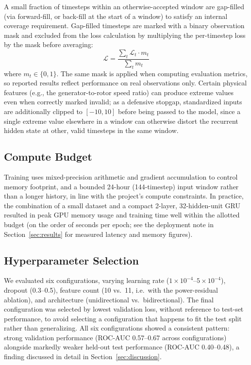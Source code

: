 \documentclass[conference]{IEEEtran}
\begin{document}
A small fraction of timesteps within an otherwise-accepted window are
gap-filled (via forward-fill, or back-fill at the start of a window) to
satisfy an internal coverage requirement. Gap-filled timesteps are marked
with a binary observation mask and excluded from the loss calculation by
multiplying the per-timestep loss by the mask before averaging:
\begin{equation}
\mathcal{L} = \frac{\sum_t \mathcal{L}_t \cdot m_t}{\sum_t m_t}
\end{equation}
where $m_t \in \{0, 1\}$. The same mask is applied when computing
evaluation metrics, so reported results reflect performance on real
observations only. Certain physical features (e.g., the generator-to-rotor
speed ratio) can produce extreme values even when correctly marked
invalid; as a defensive stopgap, standardized inputs are additionally
clipped to $[-10, 10]$ before being passed to the model, since a single
extreme value elsewhere in a window can otherwise distort the recurrent
hidden state at other, valid timesteps in the same window.

\subsection{Compute Budget}

Training uses mixed-precision arithmetic and gradient accumulation to
control memory footprint, and a bounded 24-hour (144-timestep) input
window rather than a longer history, in line with the project's compute
constraints. In practice, the combination of a small dataset and a
compact 2-layer, 32-hidden-unit GRU resulted in peak GPU memory usage and
training time well within the allotted budget (on the order of seconds
per epoch; see the deployment note in Section~\ref{sec:results} for
measured latency and memory figures).

\subsection{Hyperparameter Selection}

We evaluated six configurations, varying learning rate
($1\times10^{-4}$--$5\times10^{-4}$), dropout (0.3--0.5), feature count (10
vs.\ 11, i.e.\ with the power-residual ablation), and architecture
(unidirectional vs.\ bidirectional). The final configuration was selected
by lowest validation loss, without reference to test-set performance, to
avoid selecting a configuration that happens to fit the test split rather
than generalizing. All six configurations showed a consistent pattern:
strong validation performance (ROC-AUC 0.57--0.67 across configurations)
alongside markedly weaker held-out test performance (ROC-AUC 0.40--0.48),
a finding discussed in detail in Section~\ref{sec:discussion}.
\end{document}
